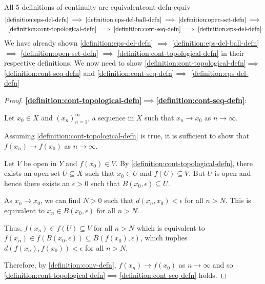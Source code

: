 \documentclass{article}
\numberwithin{equation}{section}
\numberwithin{figure}{section}
\begin{document}
\begin{theorem}{All 5 definitions of continuity are equivalent}{cont-defn-equiv}
\begin{equation}
        \begin{split}
        \text{\cref{definition:eps-del-defn}} \implies \text{\cref{definition:eps-del-ball-defn}} \implies \text{\cref{definition:open-set-defn}} \implies\\
        \text{\cref{definition:cont-topological-defn}}\implies \text{\cref{definition:cont-seq-defn}}\implies \text{\cref{definition:eps-del-defn}}
    \end{split}
    \end{equation}
    We have already shown \cref{definition:eps-del-defn} $\implies$ \cref{definition:eps-del-ball-defn} $\implies$ \cref{definition:open-set-defn} $\implies$ \cref{definition:cont-topological-defn} in their respective definitions.
    We now need to show \cref{definition:cont-topological-defn}$\implies$\cref{definition:cont-seq-defn} and \cref{definition:cont-seq-defn}$\implies$ \cref{definition:eps-del-defn}
    \begin{proof}
        \textbf{\cref{definition:cont-topological-defn}$\implies$\cref{definition:cont-seq-defn}}:

        Let $x_0\in X$ and $(x_n)^\infty_{n=1}$, a sequence in $X$ such that $x_n \to x_0$ as $n \to \infty$.

        Assuming \cref{definition:cont-topological-defn} is true, it is sufficient to show that $f(x_n)\to f(x_0)$ as $n \to \infty$. 
        
        Let $V$ be open in $Y$ and $f(x_0)\in V$. By \cref{definition:cont-topological-defn}, there exists an open set $U \subseteq X$ such that $x_0 \in U$ and $f(U)\subseteq V$. But $U$ is open and hence there exists an $\epsilon >0$ such that $B(x_0, \epsilon)\subseteq U$.

        As $x_n \to x_0$, we can find $N>0$ such that $d(x_n, x_0)<\epsilon$ for all $n>N$. This is equivalent to $x_n \in B(x_0, \epsilon)$ for all $n>N$.

        Thus, $f(x_n)\in f(U) \subseteq V$ for all $n>N$ which is equivalent to $f(x_n) \in f(B(x_0,\epsilon))\subseteq B(f(x_0),\epsilon)$, which implies $d(f(x_n),f(x_0))<\epsilon$ for all $n>N$. 
        
        Therefore, by \cref{definition:conv-defn}, $f(x_n)\to f(x_0)$ as $n \to \infty$ and so \cref{definition:cont-topological-defn}$\implies$\cref{definition:cont-seq-defn} holds.


\end{proof}
\end{theorem}
\end{document}
